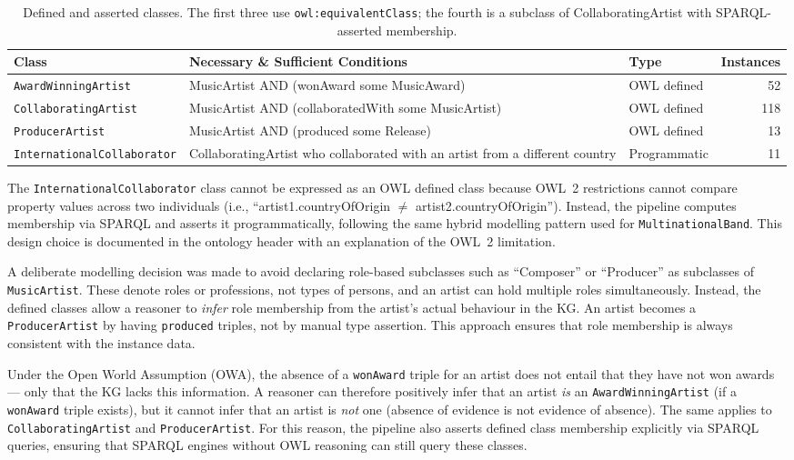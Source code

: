 \documentclass[11pt,a4paper]{article}
\begin{document}
\begin{table}[h]
\centering
\small
\begin{tabular}{lp{5cm}lr}
\toprule
\textbf{Class} & \textbf{Necessary \& Sufficient Conditions} & \textbf{Type} & \textbf{Instances} \\
\midrule
\texttt{AwardWinningArtist} & MusicArtist AND (wonAward some MusicAward) & OWL defined & 52 \\
\texttt{CollaboratingArtist} & MusicArtist AND (collaboratedWith some MusicArtist) & OWL defined & 118 \\
\texttt{ProducerArtist} & MusicArtist AND (produced some Release) & OWL defined & 13 \\
\texttt{InternationalCollaborator} & CollaboratingArtist who collaborated with an artist from a different country & Programmatic & 11 \\
\bottomrule
\end{tabular}
\caption{Defined and asserted classes. The first three use \texttt{owl:equivalentClass}; the fourth is a subclass of CollaboratingArtist with SPARQL-asserted membership.}
\end{table}

The \texttt{InternationalCollaborator} class cannot be expressed as an OWL defined class because OWL~2 restrictions cannot compare property values across two individuals (i.e., ``artist1.countryOfOrigin $\neq$ artist2.countryOfOrigin''). Instead, the pipeline computes membership via SPARQL and asserts it programmatically, following the same hybrid modelling pattern used for \texttt{MultinationalBand}. This design choice is documented in the ontology header with an explanation of the OWL~2 limitation.

A deliberate modelling decision was made to avoid declaring role-based subclasses such as ``Composer'' or ``Producer'' as subclasses of \texttt{MusicArtist}. These denote roles or professions, not types of persons, and an artist can hold multiple roles simultaneously. Instead, the defined classes allow a reasoner to \textit{infer} role membership from the artist's actual behaviour in the KG. An artist becomes a \texttt{ProducerArtist} by having \texttt{produced} triples, not by manual type assertion. This approach ensures that role membership is always consistent with the instance data.

Under the Open World Assumption (OWA), the absence of a \texttt{wonAward} triple for an artist does not entail that they have not won awards --- only that the KG lacks this information. A reasoner can therefore positively infer that an artist \textit{is} an \texttt{AwardWinningArtist} (if a \texttt{wonAward} triple exists), but it cannot infer that an artist is \textit{not} one (absence of evidence is not evidence of absence). The same applies to \texttt{CollaboratingArtist} and \texttt{ProducerArtist}. For this reason, the pipeline also asserts defined class membership explicitly via SPARQL queries, ensuring that SPARQL engines without OWL reasoning can still query these classes.
\end{document}
